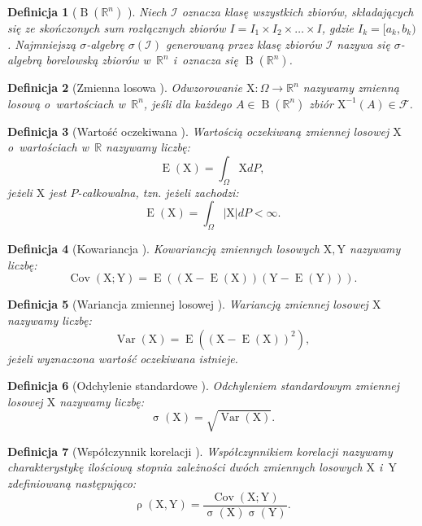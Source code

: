 \documentclass[12pt,a4paper]{report}
\newtheorem{df}{Definicja}[chapter]
\newcommand{\setR}{\mathbb{R}}
\newcommand{\ro}[2]{\operatorname{\rho}\left( {#1},{#2} \right)}
\newcommand{\Covariance}[2]{\operatorname{Cov}\left({#1}; {#2} \right)}
\newcommand{\variance}[1]{\operatorname{Var}\left({#1} \right)}
\newcommand{\e}[1]{\operatorname{E}\left({#1} \right)}
\newcommand{\standard}[1]{\operatorname{\sigma}\left({#1} \right)}
\newcommand{\sigmacialo}[1]{\operatorname{B}\left({#1} \right)}
\begin{document}
\begin{df}[$\sigmacialo{\setR^n}$ {\citep[Sec 1.12]{wztp}}]
Niech $\mathcal{I}$ oznacza klasę wszystkich zbiorów, składających się ze skończonych sum rozłącznych zbiorów $\mathit{I} = \mathit{I}_1 \times \mathit{I}_2 \times \ldots \times \mathit{I}$, gdzie $\mathit{I}_k = [a_k,b_k)$.
Najmniejszą $\sigma$-algebrę $\sigma(\mathcal{I})$ generowaną przez klasę zbiorów $\mathcal{I}$ nazywa się $\sigma$-algebrą borelowską zbiorów w~$\setR^n$ i~oznacza się $\sigmacialo{\setR^n}$.
\end{df}

\begin{df}[Zmienna losowa {\citep[Sec 5.1 Def. 1]{jakubowski}}]
Odwzorowanie $\mathrm{X}: \Omega \to \setR^n$ nazywamy zmienną losową o~wartościach w~$\setR^n$, jeśli dla każdego $\mathit{A} \in \sigmacialo{\setR^n}$ zbiór $\mathrm{X}^{-1}(\mathit{A}) \in \mathcal{F}$.
\end{df}

\begin{df}[Wartość oczekiwana {\citep[Sec 5.6 Def. 2]{jakubowski}}]
Wartością oczekiwaną zmiennej losowej $\mathrm{X}$ o~wartościach w~$\setR$ nazywamy liczbę:
$$
\e{\mathrm{X}} = \int_{\Omega} \mathrm{X} dP,
$$
jeżeli $\mathrm{X}$ jest $P$-całkowalna, tzn. jeżeli zachodzi:
$$
\e{\mathrm{X}} = \int_{\Omega} |\mathrm{X}| dP < \infty.
$$
\end{df}
\begin{df}[Kowariancja {\citep[Sec 2.8 Def.2.32]{wztp}}]
Kowariancją zmiennych losowych $\mathrm{X},\mathrm{Y}$ nazywamy liczbę:
$$
\Covariance{\mathrm{X}}{\mathrm{Y}} = \e{(\mathrm{X}-\e{\mathrm{X}})(\mathrm{Y}-\e{\mathrm{Y}})}.
$$
\end{df}

\begin{df}[Wariancja zmiennej losowej {\citep[Sec 2.8 Def.2.28]{wztp}}]
Wariancją zmiennej losowej $\mathrm{X}$ nazywamy liczbę:
$$
\variance{\mathrm{X}}=\e{(\mathrm{X}-\e{\mathrm{X}})^2},
$$
jeżeli wyznaczona wartość oczekiwana istnieje.
\end{df} 
\begin{df}[Odchylenie standardowe {\citep[Sec 2.8 Def.2.28]{wztp}}]
Odchyleniem standardowym zmiennej losowej $\mathrm{X}$ nazywamy liczbę:
$$
\standard{\mathrm{X}}=\sqrt{\variance{\mathrm{X}}}.
$$
\end{df}
\begin{df}[Współczynnik korelacji {\citep{wztp}}]
Współczynnikiem korelacji nazywamy charakterystykę ilościową stopnia zależności dwóch zmiennych losowych $\mathrm{X}$ i~$\mathrm{Y}$ zdefiniowaną następująco:
$$
\ro{\mathrm{X}}{\mathrm{Y}} = \frac{\Covariance{\mathrm{X}}{\mathrm{Y}}}{\standard{\mathrm{X}} \standard{\mathrm{Y}}}.
$$
\end{df}
\end{document}
